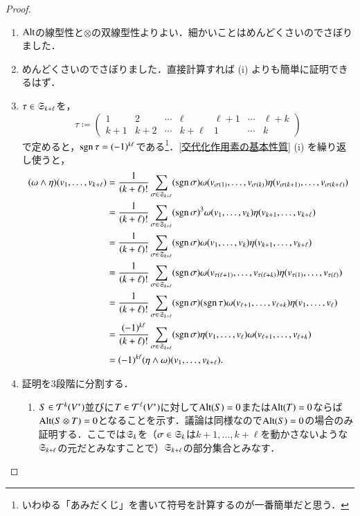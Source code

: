 \begin{proof}
\leavevmode
\begin{enumerate}
\item $\operatorname{Alt}$の線型性と$\otimes$の双線型性よりよい．細かいことはめんどくさいのでさぼりました．
\item めんどくさいのでさぼりました．直接計算すれば (i) よりも簡単に証明できるはず．
\item $\tau \in \mathfrak{S}_{k + \ell}$を，
\begin{equation}
\tau \coloneqq 
    \begin{pmatrix}
    1 & 2 & \cdots & \ell & \ell+1 & \cdots & \ell + k \\
    k+1 & k+2 & \cdots & k + \ell & 1 & \cdots & k
    \end{pmatrix}
\end{equation}で定めると，$\operatorname{sgn} \tau = (-1)^{k \ell}$である\footnote{いわゆる「あみだくじ」を書いて符号を計算するのが一番簡単だと思う．}．\cref{交代化作用素の基本性質} (i) を繰り返し使うと，
\begin{align}
(\omega \wedge \eta)(v_1,\dots, v_{k+\ell}) &= \frac{1}{(k+\ell)!} \sum_{\sigma \in \mathfrak{S}_{k+ \ell}} (\operatorname{sgn} \sigma) \omega(v_{\sigma(1)}, \dots, v_{\sigma(k)}) \eta (v_{\sigma(k+1)}, \dots, v_{\sigma(k+\ell)})\\
&= \frac{1}{(k+\ell)!} \sum_{\sigma \in \mathfrak{S}_{k+ \ell}} (\operatorname{sgn} \sigma)^3 \omega(v_{1}, \dots, v_{k}) \eta (v_{k+1}, \dots, v_{k+\ell})\\
&= \frac{1}{(k+\ell)!} \sum_{\sigma \in \mathfrak{S}_{k+ \ell}} (\operatorname{sgn} \sigma) \omega(v_{1}, \dots, v_{k}) \eta (v_{k+1}, \dots, v_{k+\ell})\\
&= \frac{1}{(k+\ell)!} \sum_{\sigma \in \mathfrak{S}_{k+ \ell}} (\operatorname{sgn} \sigma) \omega(v_{\tau(\ell+ 1)}, \dots, v_{\tau(\ell + k)}) \eta (v_{\tau(1)}, \dots, v_{\tau(\ell)})\\
&= \frac{1}{(k+\ell)!} \sum_{\sigma \in \mathfrak{S}_{k+ \ell}} (\operatorname{sgn} \sigma)(\operatorname{sgn} \tau) \omega(v_{\ell+ 1}, \dots, v_{\ell + k}) \eta (v_{1}, \dots, v_{\ell})\\
&= \frac{(-1)^{k\ell}}{(k+\ell)!} \sum_{\sigma \in \mathfrak{S}_{k+ \ell}} (\operatorname{sgn} \sigma) \eta (v_{1}, \dots, v_{\ell})\omega(v_{\ell+ 1}, \dots, v_{\ell + k}) \\
&= (-1)^{k\ell}(\eta \wedge \omega)(v_1,\dots, v_{k+\ell}).
\end{align}
\item 証明を3段階に分割する．
\begin{enumerate}
\item $S \in \mathcal{T}^k(V^*)$並びに$T \in \mathcal{T}^\ell(V^*)$に対して$\operatorname{Alt}(S)=0$または$\operatorname{Alt}(T)=0$ならば$\operatorname{Alt}(S \otimes T)=0$となることを示す．議論は同様なので$\operatorname{Alt}(S)=0$の場合のみ証明する．ここでは$\mathfrak{S}_k$を（$\sigma \in \mathfrak{S}_k$は$k+1, \dots, k+\ell$を動かさないような$\mathfrak{S}_{k+\ell}$の元だとみなすことで）$\mathfrak{S}_{k+\ell}$の部分集合とみなす．

\end{enumerate}
\end{enumerate}
\end{proof}
